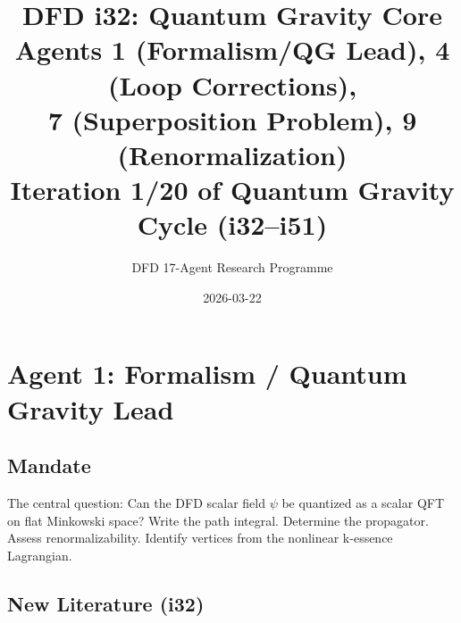 \documentclass[11pt,a4paper]{article}
\title{DFD i32: Quantum Gravity Core\\[6pt]
\large Agents 1 (Formalism/QG Lead), 4 (Loop Corrections),\\
7 (Superposition Problem), 9 (Renormalization)\\[6pt]
\normalsize Iteration 1/20 of Quantum Gravity Cycle (i32--i51)}
\author{DFD 17-Agent Research Programme}
\date{2026-03-22}
\begin{document}
\maketitle
\tableofcontents
\newpage

\section{Agent 1: Formalism / Quantum Gravity Lead}
\label{sec:agent1}

\subsection{Mandate}

The central question: Can the DFD scalar field $\psi$ be quantized as a scalar QFT on flat Minkowski space? Write the path integral. Determine the propagator. Assess renormalizability. Identify vertices from the nonlinear k-essence Lagrangian.

\subsection{New Literature (i32)}
\end{document}
